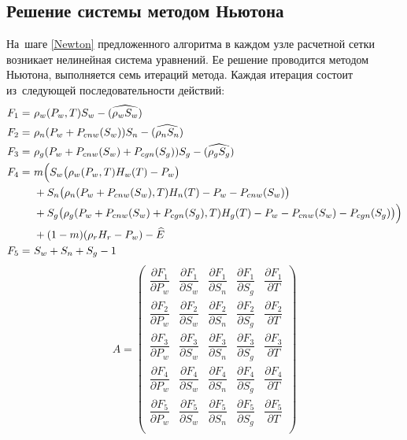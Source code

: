 \newpage
\subsection{Решение системы методом Ньютона} На~шаге \ref{Newton}
предложенного алгоритма в каждом узле расчетной сетки возникает 
нелинейная система уравнений.
Ее решение проводится методом Ньютона\cite{Kalitkin}, выполняется семь
итераций метода. Каждая итерация 
состоит из~следующей последовательности действий:
\begin{eqnarray*}
  \begin{aligned}
    F_1=\ &\rho_w(P_w, T) S_w - (\widehat{\rho_w S_w}) \\
    F_2=\ &\rho_n(P_w+P_{cnw}(S_w)) S_n - (\widehat{\rho_n S_n}) \\
    F_3=\ &\rho_g(P_w+P_{cnw}(S_w)+P_{cgn}(S_g)) S_g - (\widehat{\rho_g S_g}) \\
    F_4=\ & m \Big{(}S_w \big{(}\rho_w(P_w, T) H_w(T) - P_w\big{)} \\
	 &+ S_n \big{(}\rho_n(P_w+P_{cnw}(S_w), T) H_n(T) - P_w - P_{cnw}(S_w)\big{)} \\
	 &+ S_g \big{(}\rho_g(P_w+P_{cnw}(S_w)+P_{cgn}(S_g), T) H_g(T) - P_w - P_{cnw}(S_w) - P_{cgn}(S_g)\big{)}
	 \Big{)}\\
	 &+ (1-m) (\rho_r H_r - P_w) - \widehat{E} \\
    F_5=\ &S_w+S_n+S_g - 1
  \end{aligned}
\end{eqnarray*}
\begin{equation}
A=
\begin{pmatrix}
\dfrac{\partial{F_1}}{\partial{P_w}} & \dfrac{\partial{F_1}}{\partial{S_w}} & \dfrac{\partial{F_1}}{\partial{S_n}} & \dfrac{\partial{F_1}}{\partial{S_g}} & \dfrac{\partial{F_1}}{\partial{T}}\\[3mm]
\dfrac{\partial{F_2}}{\partial{P_w}} & \dfrac{\partial{F_2}}{\partial{S_w}} & \dfrac{\partial{F_2}}{\partial{S_n}} & \dfrac{\partial{F_2}}{\partial{S_g}} & \dfrac{\partial{F_2}}{\partial{T}}\\[3mm]
\dfrac{\partial{F_3}}{\partial{P_w}} & \dfrac{\partial{F_3}}{\partial{S_w}} & \dfrac{\partial{F_3}}{\partial{S_n}} & \dfrac{\partial{F_3}}{\partial{S_g}} & \dfrac{\partial{F_3}}{\partial{T}}\\[3mm]
\dfrac{\partial{F_4}}{\partial{P_w}} & \dfrac{\partial{F_4}}{\partial{S_w}} & \dfrac{\partial{F_4}}{\partial{S_n}} & \dfrac{\partial{F_4}}{\partial{S_g}} & \dfrac{\partial{F_4}}{\partial{T}}\\[3mm]
\dfrac{\partial{F_5}}{\partial{P_w}} & \dfrac{\partial{F_5}}{\partial{S_w}} & \dfrac{\partial{F_5}}{\partial{S_n}} & \dfrac{\partial{F_5}}{\partial{S_g}} & \dfrac{\partial{F_5}}{\partial{T}}\\[3mm]
\end{pmatrix}
\end{equation}

